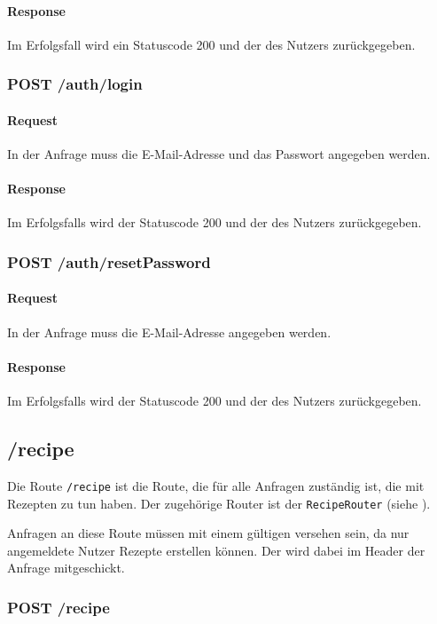 \documentclass{entwurfsheft}
\begin{document}
\paragraph{Response}
Im Erfolgsfall wird ein Statuscode 200 und der  des Nutzers zurückgegeben.

\subsubsection*{POST /auth/login}
    \paragraph{Request}
        In der Anfrage muss die E-Mail-Adresse und das Passwort angegeben werden.
    \paragraph{Response}
        Im Erfolgsfalls wird der Statuscode 200 und der  des Nutzers zurückgegeben.

\subsubsection*{POST /auth/resetPassword}
    \paragraph{Request}
        In der Anfrage muss die E-Mail-Adresse angegeben werden.
    \paragraph{Response}
        Im Erfolgsfalls wird der Statuscode 200 und der  des Nutzers zurückgegeben. 

\subsection{/recipe}
Die Route \texttt{/recipe} ist die Route, die für alle Anfragen zuständig ist, die mit Rezepten zu tun haben.
Der zugehörige Router ist der \texttt{RecipeRouter} (siehe ).

Anfragen an diese Route müssen mit einem gültigen  versehen sein, da nur angemeldete Nutzer Rezepte erstellen können.
Der  wird dabei im Header der Anfrage mitgeschickt.

\subsubsection*{POST /recipe}
\end{document}
